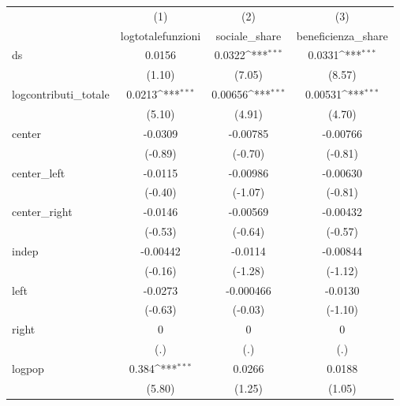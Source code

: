 \documentclass[authoryear,preprint,review,12pt]{elsarticle}
\begin{document}
\def\sym#1{\ifmmode^{#1}\else\(^{#1}\)\fi}
\begin{tabular}{l*{3}{c}}
\hline\hline
            &\multicolumn{1}{c}{(1)}&\multicolumn{1}{c}{(2)}&\multicolumn{1}{c}{(3)}\\
            &\multicolumn{1}{c}{logtotalefunzioni}&\multicolumn{1}{c}{sociale\_share}&\multicolumn{1}{c}{beneficienza\_share}\\
\hline
ds          &      0.0156         &      0.0322\sym{***}&      0.0331\sym{***}\\
            &      (1.10)         &      (7.05)         &      (8.57)         \\
[1em]
logcontributi\_totale&      0.0213\sym{***}&     0.00656\sym{***}&     0.00531\sym{***}\\
            &      (5.10)         &      (4.91)         &      (4.70)         \\
[1em]
center      &     -0.0309         &    -0.00785         &    -0.00766         \\
            &     (-0.89)         &     (-0.70)         &     (-0.81)         \\
[1em]
center\_left &     -0.0115         &    -0.00986         &    -0.00630         \\
            &     (-0.40)         &     (-1.07)         &     (-0.81)         \\
[1em]
center\_right&     -0.0146         &    -0.00569         &    -0.00432         \\
            &     (-0.53)         &     (-0.64)         &     (-0.57)         \\
[1em]
indep       &    -0.00442         &     -0.0114         &    -0.00844         \\
            &     (-0.16)         &     (-1.28)         &     (-1.12)         \\
[1em]
left        &     -0.0273         &   -0.000466         &     -0.0130         \\
            &     (-0.63)         &     (-0.03)         &     (-1.10)         \\
[1em]
right       &           0         &           0         &           0         \\
            &         (.)         &         (.)         &         (.)         \\
[1em]
logpop      &       0.384\sym{***}&      0.0266         &      0.0188         \\
            &      (5.80)         &      (1.25)         &      (1.05)         \\

\end{tabular}
\end{document}
